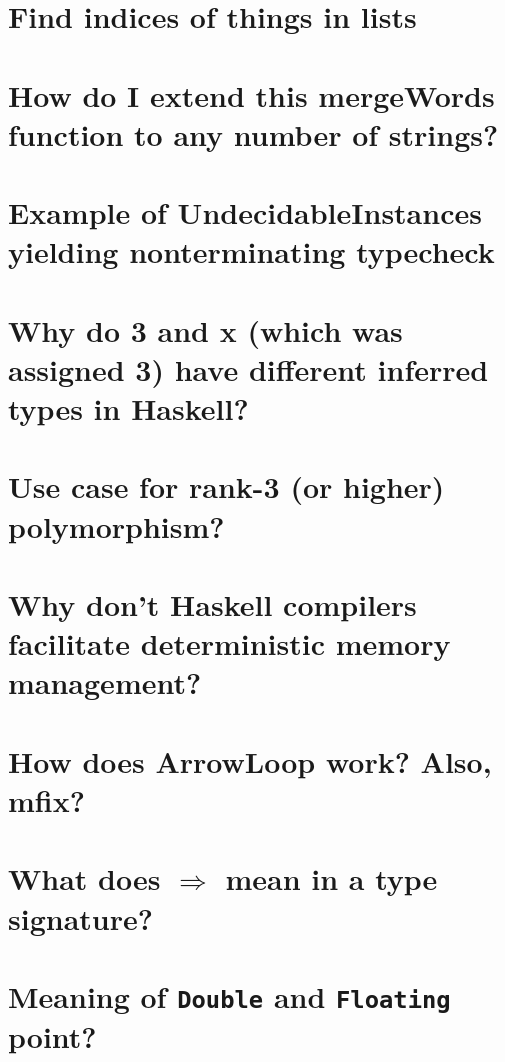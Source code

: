 \documentclass{book}%
\begin{document}
\section{Find indices of things in lists}


\section{How do I extend this mergeWords function to any number of strings?}


\section{Example of UndecidableInstances yielding nonterminating typecheck}


\section{Why do 3 and x (which was assigned 3) have different inferred types in Haskell?}


\section{Use case for rank-3 (or higher) polymorphism?}


\section{Why don't Haskell compilers facilitate deterministic memory management?}


\section{How does ArrowLoop work? Also, mfix?}


\section{What does $\Rightarrow$ mean in a type signature?}


\section{Meaning of {\texttt{Double}} and {\texttt{Floating}} point?}

\end{document}
